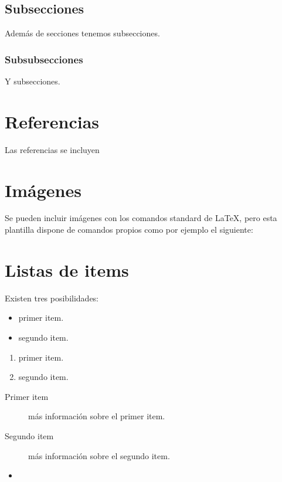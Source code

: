 \subsection{Subsecciones}

Además de secciones tenemos subsecciones.

\subsubsection{Subsubsecciones}

Y subsecciones. 


\section{Referencias}

Las referencias se incluyen 


\section{Imágenes}

Se pueden incluir imágenes con los comandos standard de \LaTeX, pero esta plantilla dispone de comandos propios como por ejemplo el siguiente:


\section{Listas de items}

Existen tres posibilidades:

\begin{itemize}
	\item primer item.
	\item segundo item.
\end{itemize}

\begin{enumerate}
	\item primer item.
	\item segundo item.
\end{enumerate}

\begin{description}
	\item[Primer item] más información sobre el primer item.
	\item[Segundo item] más información sobre el segundo item.
\end{description}
	
\begin{itemize}
\item 
\end{itemize}


